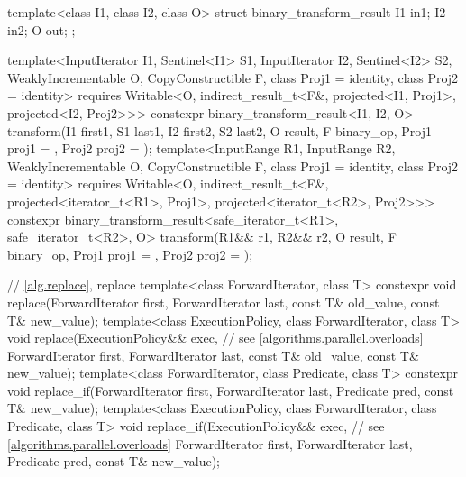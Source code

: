 \begin{codeblock}
{{    template<class I1, class I2, class O>
    struct binary_transform_result {
      I1 in1;
      I2 in2;
      O  out;
    };

    template<InputIterator I1, Sentinel<I1> S1, InputIterator I2, Sentinel<I2> S2,
             WeaklyIncrementable O, CopyConstructible F, class Proj1 = identity,
             class Proj2 = identity>
      requires Writable<O, indirect_result_t<F&, projected<I1, Proj1>,
                                             projected<I2, Proj2>>>
      constexpr binary_transform_result<I1, I2, O>
        transform(I1 first1, S1 last1, I2 first2, S2 last2, O result,
                  F binary_op, Proj1 proj1 = {}, Proj2 proj2 = {});
    template<InputRange R1, InputRange R2, WeaklyIncrementable O,
             CopyConstructible F, class Proj1 = identity, class Proj2 = identity>
      requires Writable<O, indirect_result_t<F&, projected<iterator_t<R1>, Proj1>,
                                             projected<iterator_t<R2>, Proj2>>>
      constexpr binary_transform_result<safe_iterator_t<R1>, safe_iterator_t<R2>, O>
        transform(R1&& r1, R2&& r2, O result,
                  F binary_op, Proj1 proj1 = {}, Proj2 proj2 = {});
  }

  // \ref{alg.replace}, replace
  template<class ForwardIterator, class T>
    constexpr void replace(ForwardIterator first, ForwardIterator last,
                           const T& old_value, const T& new_value);
  template<class ExecutionPolicy, class ForwardIterator, class T>
    void replace(ExecutionPolicy&& exec, // see \ref{algorithms.parallel.overloads}
                 ForwardIterator first, ForwardIterator last,
                 const T& old_value, const T& new_value);
  template<class ForwardIterator, class Predicate, class T>
    constexpr void replace_if(ForwardIterator first, ForwardIterator last,
                              Predicate pred, const T& new_value);
  template<class ExecutionPolicy, class ForwardIterator, class Predicate, class T>
    void replace_if(ExecutionPolicy&& exec, // see \ref{algorithms.parallel.overloads}
                    ForwardIterator first, ForwardIterator last,
                    Predicate pred, const T& new_value);

}
\end{codeblock}
